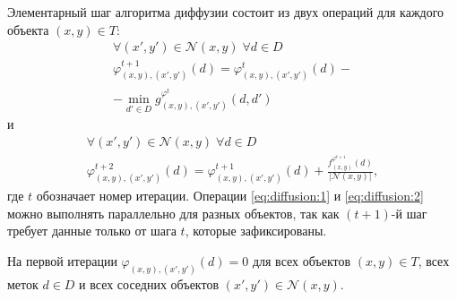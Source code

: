 \documentclass{ConfFTI}
\begin{document}
Элементарный шаг алгоритма диффузии состоит из двух операций для каждого объекта
$\left(x, y \right) \in T$:
\begin{equation}\label{eq:diffusion:1}
\begin{gathered}
    \forall \left(x', y' \right) \in \mathcal{N}\left(x, y \right) \;
    \forall d \in D \\
    \varphi_{\left(x, y\right), \left(x', y' \right)}^{t + 1} \left( d \right) =
    \varphi_{\left(x, y\right), \left(x', y' \right)}^t \left( d \right) - \\
    - \min \limits_{d' \in D}
        g_{\left(x, y \right), \left(x', y' \right)}^{\varphi^t} \left(
            d, d'
        \right)
\end{gathered}
\end{equation}
и
\begin{equation}\label{eq:diffusion:2}
\begin{gathered}
    \forall \left(x', y' \right) \in \mathcal{N}\left(x, y \right) \;
    \forall d \in D \\
    \varphi_{\left(x, y\right), \left(x', y' \right)}^{t + 2} \left( d \right) =
    \varphi_{\left(x, y\right), \left(x', y' \right)}^{t + 1} \left( d \right) +
    \frac{f_{\left(x, y \right)}^{\varphi^{t + 1}}\left(d \right)}{\left| \mathcal{N}\left(x, y \right)\right|},
\end{gathered}
\end{equation}
где $t$ обозначает номер итерации.
Операции \eqref{eq:diffusion:1} и \eqref{eq:diffusion:2}
можно выполнять параллельно для разных объектов, так как $\left(t + 1 \right)$-й
шаг требует данные только от шага $t$, которые зафиксированы.

На первой итерации
$\varphi_{\left(x, y \right), \left(x', y' \right)} \left(d \right) = 0$
для всех объектов $\left(x, y \right) \in T$, всех меток $d \in D$
и всех соседних объектов
$\left(x', y'\right) \in \mathcal{N}\left(x, y \right)$.
\end{document}
